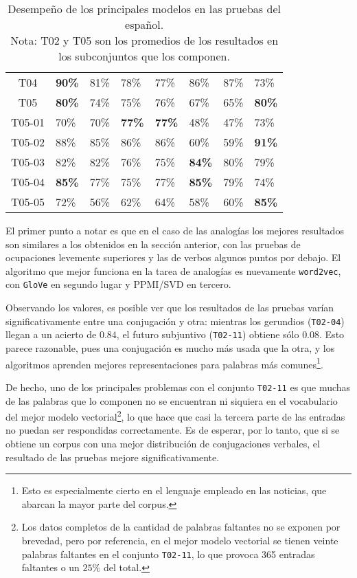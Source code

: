 \begin{table}[!h]
\begin{tabularx}{\textwidth}{c*{7}{Z}}
        T04 & \textbf{90\%} & 81\% & 78\% & 77\% & 86\% & 87\% & 73\%\\
        T05 & \textbf{80\%} & 74\% & 75\% & 76\% & 67\% & 65\% & \textbf{80\%}\\
        T05-01 & 70\% & 70\% & \textbf{77\%} & \textbf{77\%} & 48\% & 47\% & 73\%\\
        T05-02 & 88\% & 85\% & 86\% & 86\% & 60\% & 59\% & \textbf{91\%}\\
        T05-03 & 82\% & 82\% & 76\% & 75\% & \textbf{84\%} & 80\% & 79\%\\
        T05-04 & \textbf{85\%} & 77\% & 75\% & 77\% & \textbf{85\%} & 79\% & 74\%\\
        T05-05 & 72\% & 56\% & 62\% & 64\% & 58\% & 60\% & \textbf{85\%}\\
        \midrule
        \bottomrule
    \end{tabularx}
    \caption{Desempeño de los principales modelos en las pruebas del español.\\
    Nota: T02 y T05 son los promedios de los resultados en los subconjuntos que los componen.}
    \label{table:spanish_results}
\end{table}

El primer punto a notar es que en el caso de las analogías los mejores resultados son similares a
los obtenidos en la sección anterior, con las pruebas de ocupaciones levemente superiores y las de
verbos algunos puntos por debajo. El algoritmo que mejor funciona en la tarea de analogías es
nuevamente \texttt{word2vec}, con \texttt{GloVe} en segundo lugar y PPMI/SVD en tercero.

Observando los valores, es posible ver que los resultados de las pruebas varían significativamente
entre una conjugación y otra: mientras los gerundios (\texttt{T02-04}) llegan a un acierto de
$0.84$, el futuro subjuntivo (\texttt{T02-11}) obtiene sólo $0.08$. Esto parece razonable, pues una
conjugación es mucho más usada que la otra, y los algoritmos aprenden mejores representaciones para
palabras más comunes\footnote{Esto es especialmente cierto en el lenguaje empleado en las noticias,
que abarcan la mayor parte del corpus.}.

De hecho, uno de los principales problemas con el conjunto \texttt{T02-11} es que muchas de las
palabras que lo componen no se encuentran ni siquiera en el vocabulario del mejor modelo
vectorial\footnote{Los datos completos de la cantidad de palabras faltantes no se exponen por
brevedad, pero por referencia, en el mejor modelo vectorial se tienen veinte palabras faltantes en
el conjunto \texttt{T02-11}, lo que provoca 365 entradas faltantes o un $25\%$ del total.}, lo que
hace que casi la tercera parte de las entradas no puedan ser respondidas correctamente. Es de
esperar, por lo tanto, que si se obtiene un corpus con una mejor distribución de conjugaciones
verbales, el resultado de las pruebas mejore significativamente.

